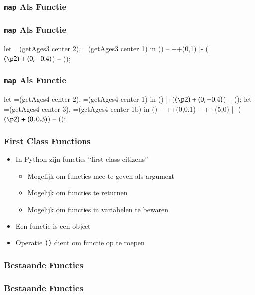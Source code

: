 \begin{frame}
  \frametitle{\texttt{map} Als Functie}
\end{frame}

\begin{frame}
  \frametitle{\texttt{map} Als Functie}
    let =(getAges3 center 2), =(getAges3 center 1) in () -- ++(0,1) |- ($ (\p2) + (0,-0.4) $) -- ();
\end{frame}

\begin{frame}
  \frametitle{\texttt{map} Als Functie}
    let =(getAges4 center 2), =(getAges4 center 1) in () |- ($ (\p2) + (0,-0.4) $) -- ();
    let =(getAges4 center 3), =(getAges4 center 1b) in () -- ++(0,0.1) -- ++(5,0) |- ($ (\p2) + (0,0.3) $) -- ();
\end{frame}

\begin{frame}
  \frametitle{First Class Functions}
  \begin{itemize}
    \item In Python zijn functies ``first class citizens''
          \begin{itemize}
            \item Mogelijk om functies mee te geven als argument
            \item Mogelijk om functies te returnen
            \item Mogelijk om functies in variabelen te bewaren
          \end{itemize}
    \item Een functie is een object
    \item Operatie \texttt{()} dient om functie op te roepen
  \end{itemize}
\end{frame}

\begin{frame}
  \frametitle{Bestaande Functies}
\end{frame}

\begin{frame}
  \frametitle{Bestaande Functies}
\end{frame}


